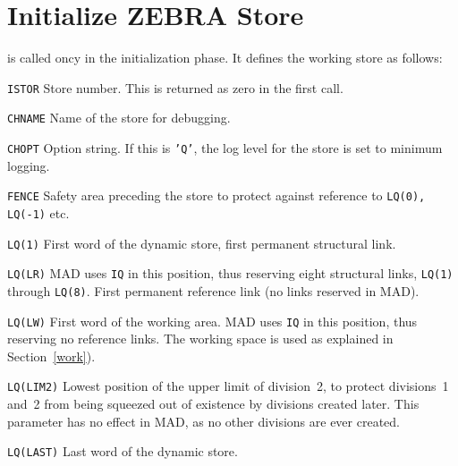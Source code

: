 \section{Initialize ZEBRA Store}
\label{MZSTOR}
is called oncy in the initialization phase.
It defines the working store as follows:
\begin{mylist}
\item[\tt ISTOR]
    Store number. This is returned as zero in the first call.
\item[\tt CHNAME]
    Name of the store for debugging.
\item[\tt CHOPT]
    Option string. If this is {\tt 'Q'}, the log level for the store
    is set to minimum logging.
\item[\tt FENCE]
    Safety area preceding the store to protect against reference to
    {\tt LQ(0), LQ(-1)} etc.
\item[\tt LQ(1)]
    First word of the dynamic store, first permanent structural link.
\item[\tt LQ(LR)]
    MAD uses {\tt IQ} in this position,
    thus reserving eight structural links, {\tt LQ(1)} through
    {\tt LQ(8)}. 
    First permanent reference link (no links reserved in MAD).
\item[\tt LQ(LW)]
    First word of the working area.
    MAD uses {\tt IQ} in this position,
    thus reserving no reference links.
    The working space is used as explained in Section~\ref{work}).
\item[\tt LQ(LIM2)]
    Lowest position of the upper limit of division~2,
    to protect divisions~1 and~2 from being squeezed out of existence
    by divisions created later.
    This parameter has no effect in MAD, as no other divisions 
    are ever created.
\item[\tt LQ(LAST)]
    Last word of the dynamic store.
\end{mylist}

